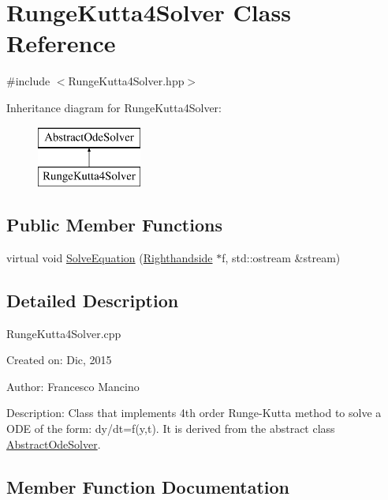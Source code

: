 \hypertarget{class_runge_kutta4_solver}{}\section{Runge\+Kutta4\+Solver Class Reference}
\label{class_runge_kutta4_solver}


{\ttfamily \#include $<$Runge\+Kutta4\+Solver.\+hpp$>$}

Inheritance diagram for Runge\+Kutta4\+Solver\+:\begin{figure}[H]
\begin{center}
\leavevmode
\includegraphics[height=2.000000cm]{class_runge_kutta4_solver}
\end{center}
\end{figure}
\subsection*{Public Member Functions}
\begin{DoxyCompactItemize}
\item 
virtual void \hyperlink{class_runge_kutta4_solver_acd37986ea1784f8ee4ae27f1614b06b8}{Solve\+Equation} (\hyperlink{class_righthandside}{Righthandside} $\ast$f, std\+::ostream \&stream)
\end{DoxyCompactItemize}


\subsection{Detailed Description}
Runge\+Kutta4\+Solver.\+cpp

Created on\+: Dic, 2015 \begin{DoxyVerb}Author: Francesco Mancino
\end{DoxyVerb}


Description\+: Class that implements 4th order Runge-\/\+Kutta method to solve a O\+D\+E of the form\+: dy/dt=f(y,t). It is derived from the abstract class \hyperlink{class_abstract_ode_solver}{Abstract\+Ode\+Solver}. 

\subsection{Member Function Documentation}
\hypertarget{class_runge_kutta4_solver_acd37986ea1784f8ee4ae27f1614b06b8}{}
